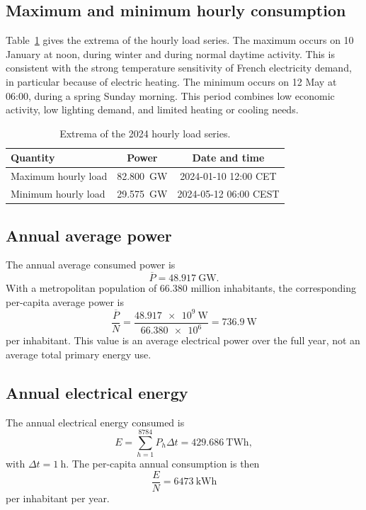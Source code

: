 \documentclass[a4paper]{report}
\begin{document}
\subsection{Maximum and minimum hourly consumption}

Table~\ref{tab:exercise1-extrema} gives the extrema of the hourly load series. The maximum occurs on 10 January at noon, during winter and during normal daytime activity. This is consistent with the strong temperature sensitivity of French electricity demand, in particular because of electric heating. The minimum occurs on 12 May at 06:00, during a spring Sunday morning. This period combines low economic activity, low lighting demand, and limited heating or cooling needs.

\begin{table}[H]
  \centering
  \caption{Extrema of the 2024 hourly load series.}
  \label{tab:exercise1-extrema}
  \begin{tabular}{lcc}
    \toprule
    Quantity & Power & Date and time \\
    \midrule
    Maximum hourly load & \SI{82.800}{\giga\watt} & 2024-01-10 12:00 CET \\
    Minimum hourly load & \SI{29.575}{\giga\watt} & 2024-05-12 06:00 CEST \\
    \bottomrule
  \end{tabular}
\end{table}

\subsection{Annual average power}

The annual average consumed power is
\[
\overline{P} = \SI{48.917}{\giga\watt}.
\]
With a metropolitan population of 66.380 million inhabitants, the corresponding per-capita average power is
\[
\frac{\overline{P}}{N} =
\frac{\SI{48.917e9}{\watt}}{\num{66.380e6}}
= \SI{736.9}{\watt}
\]
per inhabitant. This value is an average electrical power over the full year, not an average total primary energy use.

\subsection{Annual electrical energy}

The annual electrical energy consumed is
\[
E = \sum_{h=1}^{8784} P_h \Delta t
= \SI{429.686}{\tera\watt\hour},
\]
with \(\Delta t = \SI{1}{\hour}\). The per-capita annual consumption is then
\[
\frac{E}{N}
= \SI{6473}{\kilo\watt\hour}
\]
per inhabitant per year.
\end{document}
